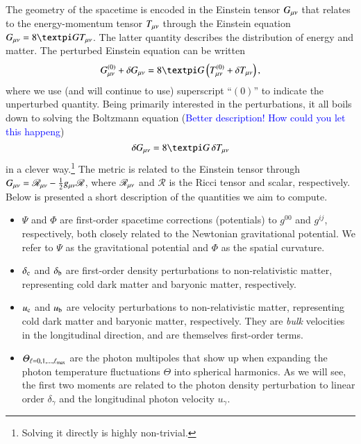 


The geometry of the spacetime is encoded in the Einstein tensor $G_{\mu \nu}$ that relates to the energy-momentum tensor $T_{\mu \nu}$ through the Einstein equation $G\munu = 8\pi G T\munu$. The latter quantity describes the distribution of energy and matter. The perturbed Einstein equation can be written
\begin{equation}
    G^{(0)}\munu +\delta G\munu = 8\pi G \left( T^{(0)}\munu+\delta T_{\mu \nu} \right),
\end{equation}
where we use (and will continue to use) superscript ``$(0)$'' to indicate the unperturbed quantity. Being primarily interested in the perturbations, it all boils down to solving the Boltzmann equation (\textcolor{blue}{Better description! How could you let this happeng})
\begin{equation}\label{mil3:theo:eq:delta_G}
    \delta G\munu = 8\pi G\, \delta T\munu
\end{equation}
in a clever way.\footnote{Solving it directly is highly non-trivial.} The metric is related to the Einstein tensor through $G_{\mu \nu}= \mathscr{R}_{\mu \nu} - \frac{1}{2}g_{\mu \nu} \mathscr{R}$, where $\mathscr{R}_{\mu \nu}$ and $\mathscr{R}$ is the Ricci tensor and scalar, respectively. 
Below is presented a short description of the quantities we aim to compute. 
\begin{itemize}
    \item $\Psi$ and $\Phi$ are first-order spacetime corrections (potentials) to $g^{00}$ and $g^{ij}$, respectively, both closely related to the Newtonian gravitational potential. We refer to $\Psi$ as the gravitational potential and $\Phi$ as the spatial curvature.
    \item $\delta_\mathrm{c}$ and $\delta_\mathrm{b}$ are first-order density perturbations to non-relativistic matter, representing cold dark matter and baryonic matter, respectively.
    \item $u_\mathrm{c}$ and $u_\mathrm{b}$ are velocity perturbations to non-relativistic matter, representing cold dark matter and baryonic matter, respectively. They are \textit{bulk} velocities in the longitudinal direction, and are themselves first-order terms.
    \item $\varTheta_{\ell= 0, 1, \dots, \ell_\mathrm{max}}$ are the photon multipoles that show up when expanding the photon temperature fluctuations $\Theta$ into spherical harmonics. As we will see, the first two moments are related to the photon density perturbation to linear order $\delta_\gamma$ and the longitudinal photon velocity $u_\gamma$.
\end{itemize}

